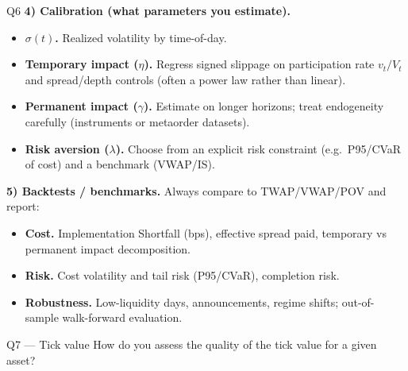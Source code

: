 \begin{solutionbox}{Q6}
\medskip
\textbf{4) Calibration (what parameters you estimate).}
\begin{itemize}[leftmargin=*]
  \item \textbf{\(\sigma(t)\).} Realized volatility by time-of-day.
  \item \textbf{Temporary impact (\(\eta\)).} Regress signed slippage on participation rate \(v_t/V_t\) and spread/depth controls (often a power law rather than linear).
  \item \textbf{Permanent impact (\(\gamma\)).} Estimate on longer horizons; treat endogeneity carefully (instruments or metaorder datasets).
  \item \textbf{Risk aversion (\(\lambda\)).} Choose from an explicit risk constraint (e.g.\ P95/CVaR of cost) and a benchmark (VWAP/IS).
\end{itemize}

\medskip
\textbf{5) Backtests / benchmarks.} Always compare to TWAP/VWAP/POV and report:
\begin{itemize}[leftmargin=*]
  \item \textbf{Cost.} Implementation Shortfall (bps), effective spread paid, temporary vs permanent impact decomposition.
  \item \textbf{Risk.} Cost volatility and tail risk (P95/CVaR), completion risk.
  \item \textbf{Robustness.} Low-liquidity days, announcements, regime shifts; out-of-sample walk-forward evaluation.
\end{itemize}
\end{solutionbox}

\begin{questionbox}{Q7 --- Tick value}
How do you assess the quality of the tick value for a given asset?
\end{questionbox}

